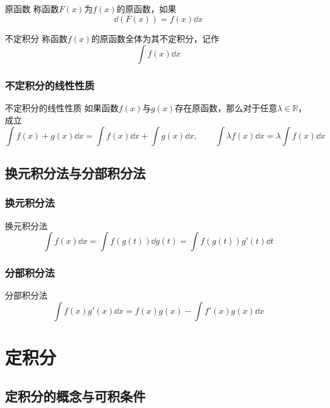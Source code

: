 \documentclass[lang = cn, scheme = chinese, thmcnt = section]{elegantbook}
\newcommand{\R}{\mathbb{R}}            %
\begin{document}
\begin{definition}{原函数}
	称函数$F(x)$为$f(x)$的原函数，如果
	$$
	\dd(F(x))=f(x)\dd x
	$$
\end{definition}

\begin{definition}{不定积分}
	称函数$f(x)$的原函数全体为其不定积分，记作
	$$
	\int f(x)\dd x
	$$
\end{definition}

\subsection{不定积分的线性性质}

\begin{theorem}{不定积分的线性性质}
	如果函数$f(x)$与$g(x)$存在原函数，那么对于任意$\lambda\in \R$，成立
	$$
	\int f(x)+g(x)\dd x
	=\int f(x)\dd x+\int g(x)\dd x
	,\qquad
	\int \lambda f(x)\dd x
	=\lambda \int f(x)\dd x
	$$
\end{theorem}

\section{换元积分法与分部积分法}

\subsection{换元积分法}

\begin{theorem}{换元积分法}
	$$
	\int f(x)\dd x
	=\int f(g(t))\dd g(t)
	=\int f(g(t))g'(t)\dd t
	$$
\end{theorem}

\subsection{分部积分法}

\begin{theorem}{分部积分法}
	$$
	\int f(x)g'(x)\dd x
	=f(x)g(x)-\int f'(x)g(x)\dd x
	$$
\end{theorem}

\chapter{定积分}

\section{定积分的概念与可积条件}
\end{document}
